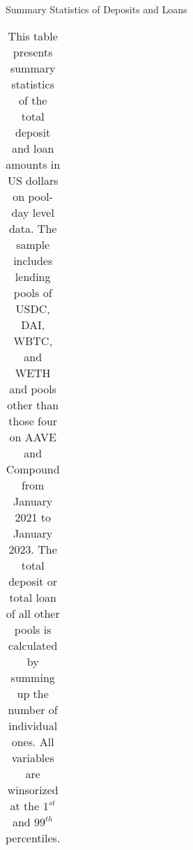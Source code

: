 \begin{table}[ht!]
\caption{Summary Statistics of Deposits and Loans}\label{tab:pool_sumstat_DL}
\caption*{This table presents summary statistics of the total deposit and loan amounts in US dollars on pool-day level data. The sample includes lending pools of USDC, DAI, WBTC, and WETH and pools other than those four on AAVE and Compound from January 2021 to January 2023. The total deposit or total loan of all other pools is calculated by summing up the number of individual ones. All variables are winsorized at the $1^{st}$ and $99^{th}$ percentiles.}


\centering
\def\sym#1{\ifmmode^{#1}\else\(^{#1}\)\fi}


\begin{tabular*}{\linewidth}{@{\extracolsep{\fill}}lccccccc}


\end{tabular*}
\end{table}
